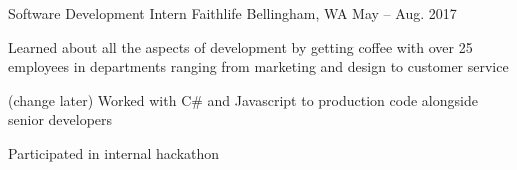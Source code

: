

\begin{cventries}

  \cventry
    {Software Development Intern} %
    {Faithlife} %
    {Bellingham, WA} %
    {May – Aug. 2017} %
    {
      \begin{cvitems} %
        \item {Learned about all the aspects of development by getting coffee with over 25 employees in departments ranging from marketing and design to customer service}
        \item {(change later) Worked with C\# and Javascript to production code alongside senior developers}
        \item {Participated in internal hackathon}
      \end{cvitems}
    }

\end{cventries}
